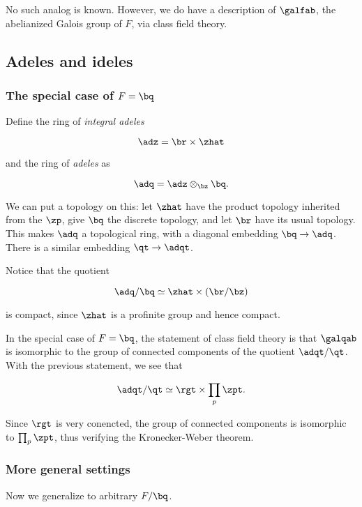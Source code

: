 No such analog is known. However, we do have a description of $\galfab$, the
abelianized Galois group of $F$, via class field theory.

\subsection{Adeles and ideles}
\label{sec:adeles-ideles}

\subsubsection{The special case of $F=\bq$}

Define the ring of \textit{integral adeles}

\[ \adz = \br \times \zhat \]

and the ring of \textit{adeles} as

\[ \adq = \adz \otimes_\bz \bq. \]

We can put a topology on this: let $\zhat$ have the product topology inherited
from the $\zp$, give $\bq$ the discrete topology, and let $\br$ have its usual
topology. This makes $\adq$ a topological ring, with a diagonal embedding
$\bq\to\adq$. There is a similar embedding $\qt \to \adqt$.

Notice that the quotient

\[ \adq/\bq \simeq \zhat \times (\br/\bz) \]

is compact, since $\zhat$ is a profinite group and hence compact.

In the special case of $F=\bq$, the statement of class field theory is that
$\galqab$ is isomorphic to the group of connected components of the quotient
$\adqt/\qt$. With the previous statement, we see that

\[ \adqt/
  \qt
  \simeq \rgt \times \prod_p \zpt. \]

Since $\rgt$ is very conencted, the group of connected components is isomorphic
to $\prod_p \zpt$, thus verifying the Kronecker-Weber theorem.

\subsubsection{More general settings}

Now we generalize to arbitrary $F/\bq$.
